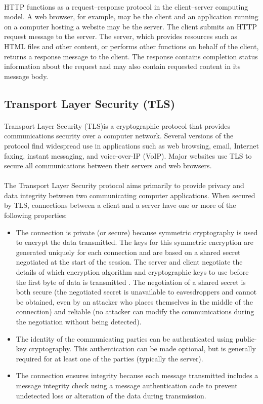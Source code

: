 \paragraph{}HTTP functions as a request–response protocol in the client–server computing model. A web browser, for example, may be the client and an application running on a computer hosting a website may be the server. The client submits an HTTP request message to the server. The server, which provides resources such as HTML files and other content, or performs other functions on behalf of the client, returns a response message to the client. The response contains completion status information about the request and may also contain requested content in its message body.

\subsection{Transport Layer Security (TLS)} 
\paragraph{}Transport Layer Security (TLS)is a cryptographic protocol that provides communications security over a computer network. Several versions of the protocol find widespread use in applications such as web browsing, email, Internet faxing, instant messaging, and voice-over-IP (VoIP). Major websites use TLS to secure all communications between their servers and web browsers.
\paragraph{}The Transport Layer Security protocol aims primarily to provide privacy and data integrity between two communicating computer applications. When secured by TLS, connections between a client  and a server have one or more of the following properties:
\begin{itemize}
\item The connection is private (or secure) because symmetric cryptography is used to encrypt the data transmitted. The keys for this symmetric encryption are generated uniquely for each connection and are based on a shared secret negotiated at the start of the session. The server and client negotiate the details of which encryption algorithm and cryptographic keys to use before the first byte of data is transmitted . The negotiation of a shared secret is both secure (the negotiated secret is unavailable to eavesdroppers and cannot be obtained, even by an attacker who places themselves in the middle of the connection) and reliable (no attacker can modify the communications during the negotiation without being detected).
\item The identity of the communicating parties can be authenticated using public-key cryptography. This authentication can be made optional, but is generally required for at least one of the parties (typically the server).
\item The connection ensures integrity because each message transmitted includes a message integrity check using a message authentication code to prevent undetected loss or alteration of the data during transmission.
\end{itemize}


